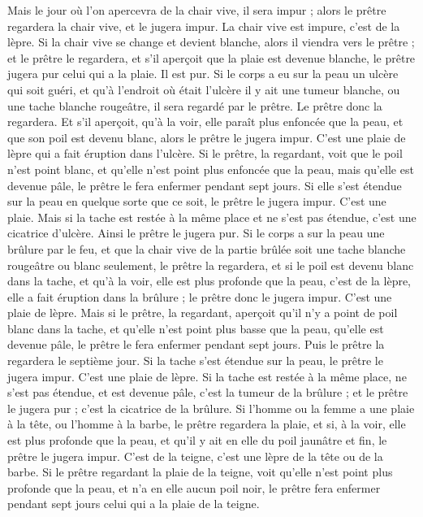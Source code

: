 \begin{multicols}{2}
Mais le jour où l'on apercevra de la chair vive, il sera impur ;
alors le prêtre regardera la chair vive, et le jugera impur. La chair vive est impure, c'est de la lèpre.
Si la chair vive se change et devient blanche, alors il viendra vers le prêtre ;
et le prêtre le regardera, et s'il aperçoit que la plaie est devenue blanche, le prêtre jugera pur celui qui a la plaie. Il est pur.
Si le corps a eu sur la peau un ulcère qui soit guéri,
et qu'à l'endroit où était l'ulcère il y ait une tumeur blanche, ou une tache blanche rougeâtre, il sera regardé par le prêtre.
Le prêtre donc la regardera. Et s'il aperçoit, qu'à la voir, elle paraît plus enfoncée que la peau, et que son poil est devenu blanc, alors le prêtre le jugera impur. C'est une plaie de lèpre qui a fait éruption dans l'ulcère.
Si le prêtre, la regardant, voit que le poil n'est point blanc, et qu'elle n'est point plus enfoncée que la peau, mais qu'elle est devenue pâle, le prêtre le fera enfermer pendant sept jours.
Si elle s'est étendue sur la peau en quelque sorte que ce soit, le prêtre le jugera impur. C'est une plaie.
Mais si la tache est restée à la même place et ne s'est pas étendue, c'est une cicatrice d'ulcère. Ainsi le prêtre le jugera pur.
Si le corps a sur la peau une brûlure par le feu, et que la chair vive de la partie brûlée soit une tache blanche rougeâtre ou blanc seulement, le prêtre la regardera,
et si le poil est devenu blanc dans la tache, et qu'à la voir, elle est plus profonde que la peau, c'est de la lèpre, elle a fait éruption dans la brûlure ; le prêtre donc le jugera impur. C'est une plaie de lèpre.
Mais si le prêtre, la regardant, aperçoit qu'il n'y a point de poil blanc dans la tache, et qu'elle n'est point plus basse que la peau, qu'elle est devenue pâle, le prêtre le fera enfermer pendant sept jours.
Puis le prêtre la regardera le septième jour. Si la tache s'est étendue sur la peau, le prêtre le jugera impur. C'est une plaie de lèpre.
Si la tache est restée à la même place, ne s'est pas étendue, et est devenue pâle, c'est la tumeur de la brûlure ; et le prêtre le jugera pur ; c'est la cicatrice de la brûlure.
Si l'homme ou la femme a une plaie à la tête, ou l'homme à la barbe,
le prêtre regardera la plaie, et si, à la voir, elle est plus profonde que la peau, et qu'il y ait en elle du poil jaunâtre et fin, le prêtre le jugera impur. C'est de la teigne, c'est une lèpre de la tête ou de la barbe.
Si le prêtre regardant la plaie de la teigne, voit qu'elle n'est point plus profonde que la peau, et n'a en elle aucun poil noir, le prêtre fera enfermer pendant sept jours celui qui a la plaie de la teigne.

\end{multicols}

